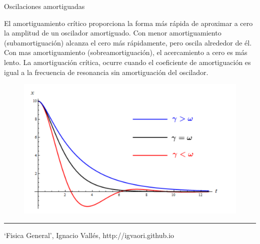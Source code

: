 \begin{myexampleblock} {Oscilaciones amortiguadas}
\begin{small}
\begin{itemize}
\end{itemize}
\vspace{2mm}
\begin{multicols}{2}
 El amortiguamiento crítico proporciona la forma más rápida de aproximar a cero la amplitud de un oscilador amortiguado. Con menor amortiguamiento (subamortiguación) alcanza el cero más rápidamente, pero oscila alrededor de él. Con mas amortiguamiento (sobreamortiguación), el acercamiento a cero es más lento. La amortiguación crítica, ocurre cuando el coeficiente de amortiguación es igual a la frecuencia de resonancia sin amortiguación del oscilador.


\begin{figure}[H]
		\centering
		\includegraphics[width=.5\textwidth]{imagenes/img04-06.png}
	\end{figure}

\end{multicols}
\end{small}

\rule{300pt}{0.1pt}
\begin{flushright} \begin{footnotesize}
	\textcolor{gris}{`Fisica General', Ignacio Vallés, http://igvaori.github.io}
\end{footnotesize} \end{flushright}


\end{myexampleblock}

